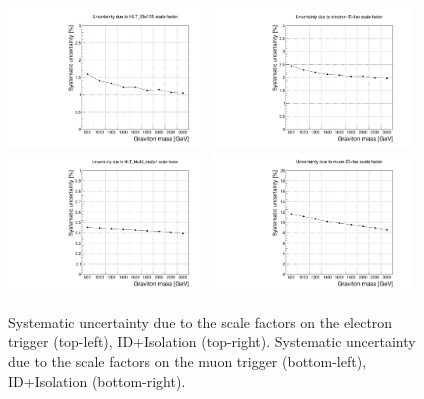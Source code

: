 \begin{figure}[h]
\begin{center}
\includegraphics[width=0.47\textwidth]{figures/systematics/hltEleSFunc.pdf}
\includegraphics[width=0.47\textwidth]{figures/systematics/IDIsoEleSFunc.pdf}\\
\includegraphics[width=0.47\textwidth]{figures/systematics/hltMuSFunc.pdf}
\includegraphics[width=0.47\textwidth]{figures/systematics/IDIsoMuSFunc.pdf}\\
\caption[Uncertainties due to lepton selection]{Systematic uncertainty due to the scale factors on the electron trigger (top-left), ID+Isolation (top-right). Systematic uncertainty due to the scale factors on the muon trigger (bottom-left), ID+Isolation (bottom-right).}
\label{fig:leptonUnc}
\end{center}
\end{figure}
